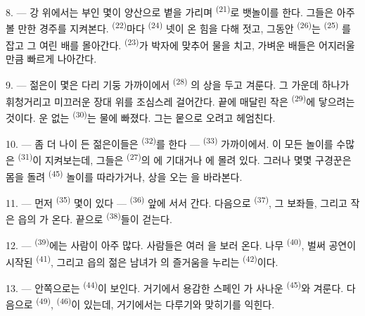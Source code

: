 8. --- 강 위에서는 부인 몇이 양산으로 볕을 가리며  \textsuperscript{(21)}로
뱃놀이를 한다. 그들은 아주 볼 만한 경주를 지켜본다. 
\textsuperscript{(22)}마다  \textsuperscript{(24)} 넷이 온 힘을 다해
젓고, 그동안  \textsuperscript{(26)}는  \textsuperscript{(25)}
를 잡고 그 여린 배를 몰아간다.  \textsuperscript{(23)}가 박자에 맞추어 물을
치고, 가벼운 배들은 어지러울 만큼 빠르게 나아간다.

9. --- 젊은이 몇은 다리 기둥 가까이에서  \textsuperscript{(28)}
의 상을 두고 겨룬다. 그 가운데 하나가 휘청거리고 미끄러운 장대 위를 조심스레 걸어간다.
끝에 매달린 작은  \textsuperscript{(29)}에 닿으려는 것이다. 운 없는
 \textsuperscript{(30)}는 물에 빠졌다. 그는 뭍으로 오려고 헤엄친다.

10. --- 좀 더 나이 든 젊은이들은  \textsuperscript{(32)}를
한다 —  \textsuperscript{(33)} 가까이에서. 이 모든 놀이를 수많은
 \textsuperscript{(31)}이 지켜보는데, 그들은 
\textsuperscript{(27)}의 에 기대거나 에 몰려 있다. 그러나
몇몇 구경꾼은 몸을 돌려  \textsuperscript{(45)} 놀이를 따라가거나,
상을  오는 을 바라본다.

11. --- 먼저  \textsuperscript{(35)} 몇이 있다 — 
\textsuperscript{(36)} 앞에 서서 간다. 다음으로  \textsuperscript{(37)},
그 보좌들, 그리고 작은 읍의 가 온다. 끝으로 
\textsuperscript{(38)}들이 걷는다.

\VUsaut{5.0mm}
\VUsaut{3.6mm}

12. ---  \textsuperscript{(39)}에는 사람이 아주 많다. 사람들은 여러
을 보러 온다. 나무  \textsuperscript{(40)},
벌써 공연이 시작된  \textsuperscript{(41)}, 그리고 읍의 젊은 남녀가
의 즐거움을 누리는  \textsuperscript{(42)}이다.

13. --- 안쪽으로는  \textsuperscript{(44)}이 보인다. 거기에서 용감한
스페인 가 사나운  \textsuperscript{(45)}와 겨룬다. 다음으로
 \textsuperscript{(49)},  \textsuperscript{(46)}이
있는데, 거기에서는  다루기와  맞히기를 익힌다.

